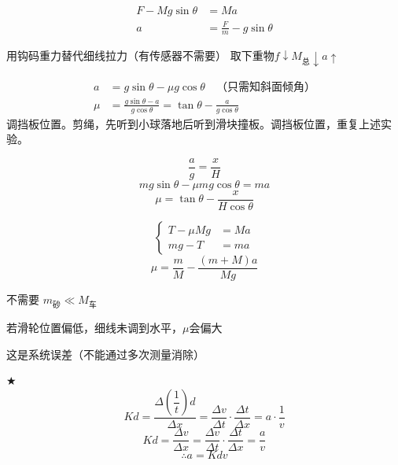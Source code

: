 \begin{align*}
F-Mg\sin\theta&=Ma\\
a&=\frac{F}{m}-g\sin\theta %
\end{align*}

用钩码重力替代细线拉力（有传感器不需要）
取下重物\quad $f\downarrow$\quad $M_{\text{总}}\downarrow$\quad $a\uparrow$

\begin{align*}
a&=g\sin\theta-\mu g\cos\theta\quad\text{（只需知斜面倾角）}\\
\mu&=\frac{g\sin\theta-a}{g\cos\theta}=\tan\theta-\frac{a}{g\cos\theta}
\end{align*}
调挡板位置。剪绳，先听到小球落地后听到滑块撞板。调挡板位置，重复上述实验。


\[ \frac{a}{g}=\frac{x}{H} \]
\[ mg\sin\theta-\mu mg\cos\theta=ma \]
\[ \mu=\tan\theta-\frac{x}{H\cos\theta} \]

\[
\left\{\begin{aligned}
T-\mu Mg&=Ma\\
mg-T&=ma
\end{aligned}\right.
\]
\[ \mu=\frac{m}{M}-\frac{(m+M)a}{Mg} \]

不需要 $m_{\text{砂}}\ll M_{\text{车}}$ %

若滑轮位置偏低，细线未调到水平，$\mu$会偏大

这是系统误差（不能通过多次测量消除）

$\bigstar$ %
\[ Kd=\frac{\Delta\!\left(\dfrac{1}{t}\right)d}{\Delta x}=\frac{\Delta v}{\Delta t}\cdot\frac{\Delta t}{\Delta x}=a\cdot\frac{1}{v} \]
\[ Kd=\frac{\Delta v}{\Delta x}=\frac{\Delta v}{\Delta t}\cdot\frac{\Delta t}{\Delta x}=\frac{a}{v} \]
\[ \therefore a=Kdv \]

